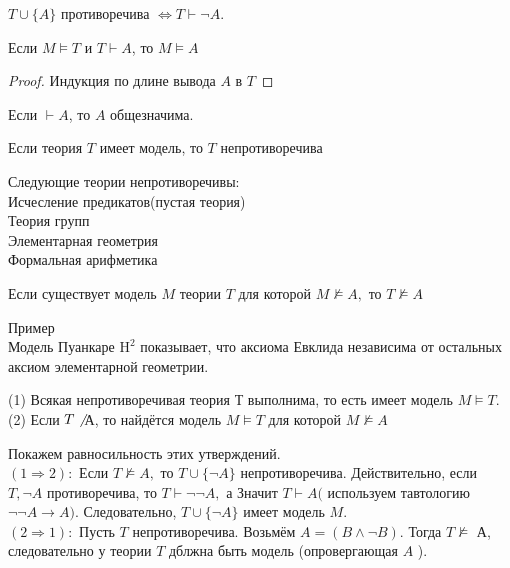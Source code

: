 \begin{corol}
$T \cup \{A\}$ противоречива $\Leftrightarrow T \vdash \neg A$.
\end{corol}
\vskip 0.2in

\begin{theo}[О корректности]
Если $M \models T$ и $T \vdash A$, то $M \models A$
\end{theo}
\begin{proof}
Индукция по длине вывода $A$ в $T$
\end{proof}

\begin{corol}
Если $\vdash A$, то $A$ общезначима.
\end{corol}
\vskip 0.2in

\begin{corol}
Если теория $T$ имеет модель, то $T$ непротиворечива
\end{corol}

\begin{corol}
Следующие теории непротиворечивы:\\
Исчесление предикатов(пустая теория)\\
Теория групп\\
Элементарная геометрия\\
Формальная арифметика
\end{corol}

\begin{corol}Если существует модель $M$ теории $T$ для которой $M \not \models A,$ то $T \not \models A$
\end{corol}
Пример\\
Модель Пуанкаре $\mathrm{H}^{2}$ показывает, что аксиома Евклида независима от остальных аксиом элементарной геометрии.

\begin{theo}
(1) Всякая непротиворечивая теория Т выполнима, то есть имеет модель $M \vDash T$.\\
(2) Если $T \not$ А, то найдётся модель $M \vDash T$ для которой $M \not \models A$
\end{theo}

Покажем равносильность этих утверждений.\\
$(1 \Rightarrow 2):$ Если $T \not \models A,$ то $T \cup\{\neg A\}$ непротиворечива. Действительно, если $T, \neg A$ противоречива, то $T \vdash \neg \neg A,$ а Значит $T \vdash A($ используем тавтологию $\neg \neg A \rightarrow A) .$ Следовательно, $T \cup\{\neg A\}$ имеет модель $M .$\\
$(2 \Rightarrow 1):$ Пусть $T$ непротиворечива. Возьмём $A=(B \wedge \neg B) .$ Тогда $T \not \models$ А, следовательно у теории $T$ дблжна быть модель (опровергающая $A$ ).
\vskip 0.3in

